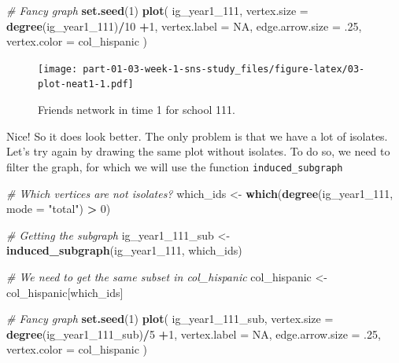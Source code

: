 \documentclass[]{book}
\newenvironment{Shaded}{\begin{snugshade}}{\end{snugshade}}
\newcommand{\CommentTok}[1]{\textcolor[rgb]{0.56,0.35,0.01}{\textit{#1}}}
\newcommand{\DataTypeTok}[1]{\textcolor[rgb]{0.13,0.29,0.53}{#1}}
\newcommand{\DecValTok}[1]{\textcolor[rgb]{0.00,0.00,0.81}{#1}}
\newcommand{\FloatTok}[1]{\textcolor[rgb]{0.00,0.00,0.81}{#1}}
\newcommand{\KeywordTok}[1]{\textcolor[rgb]{0.13,0.29,0.53}{\textbf{#1}}}
\newcommand{\NormalTok}[1]{#1}
\newcommand{\OperatorTok}[1]{\textcolor[rgb]{0.81,0.36,0.00}{\textbf{#1}}}
\newcommand{\OtherTok}[1]{\textcolor[rgb]{0.56,0.35,0.01}{#1}}
\newcommand{\StringTok}[1]{\textcolor[rgb]{0.31,0.60,0.02}{#1}}
\begin{document}
\begin{Shaded}
\begin{Highlighting}[]
\CommentTok{# Fancy graph}
\KeywordTok{set.seed}\NormalTok{(}\DecValTok{1}\NormalTok{)}
\KeywordTok{plot}\NormalTok{(}
\NormalTok{  ig_year1_}\DecValTok{111}\NormalTok{,}
  \DataTypeTok{vertex.size     =} \KeywordTok{degree}\NormalTok{(ig_year1_}\DecValTok{111}\NormalTok{)}\OperatorTok{/}\DecValTok{10} \OperatorTok{+}\DecValTok{1}\NormalTok{,}
  \DataTypeTok{vertex.label    =} \OtherTok{NA}\NormalTok{,}
  \DataTypeTok{edge.arrow.size =} \FloatTok{.25}\NormalTok{,}
  \DataTypeTok{vertex.color    =}\NormalTok{ col_hispanic}
\NormalTok{  )}
\end{Highlighting}
\end{Shaded}

\begin{figure}
\centering
\texttt{[image: part-01-03-week-1-sns-study\_files/figure-latex/03-plot-neat1-1.pdf]}
\caption{\label{fig:03-plot-neat1}Friends network in time 1 for school 111.}
\end{figure}

Nice! So it does look better. The only problem is that we have a lot of isolates. Let's try again by drawing the same plot without isolates. To do so, we need to filter the graph, for which we will use the function \texttt{induced\_subgraph}

\begin{Shaded}
\begin{Highlighting}[]
\CommentTok{# Which vertices are not isolates?}
\NormalTok{which_ids <-}\StringTok{ }\KeywordTok{which}\NormalTok{(}\KeywordTok{degree}\NormalTok{(ig_year1_}\DecValTok{111}\NormalTok{, }\DataTypeTok{mode =} \StringTok{"total"}\NormalTok{) }\OperatorTok{>}\StringTok{ }\DecValTok{0}\NormalTok{)}

\CommentTok{# Getting the subgraph}
\NormalTok{ig_year1_}\DecValTok{111}\NormalTok{_sub <-}\StringTok{ }\KeywordTok{induced_subgraph}\NormalTok{(ig_year1_}\DecValTok{111}\NormalTok{, which_ids)}

\CommentTok{# We need to get the same subset in col_hispanic}
\NormalTok{col_hispanic <-}\StringTok{ }\NormalTok{col_hispanic[which_ids]}
\end{Highlighting}
\end{Shaded}

\begin{Shaded}
\begin{Highlighting}[]
\CommentTok{# Fancy graph}
\KeywordTok{set.seed}\NormalTok{(}\DecValTok{1}\NormalTok{)}
\KeywordTok{plot}\NormalTok{(}
\NormalTok{  ig_year1_}\DecValTok{111}\NormalTok{_sub,}
  \DataTypeTok{vertex.size     =} \KeywordTok{degree}\NormalTok{(ig_year1_}\DecValTok{111}\NormalTok{_sub)}\OperatorTok{/}\DecValTok{5} \OperatorTok{+}\DecValTok{1}\NormalTok{,}
  \DataTypeTok{vertex.label    =} \OtherTok{NA}\NormalTok{,}
  \DataTypeTok{edge.arrow.size =} \FloatTok{.25}\NormalTok{,}
  \DataTypeTok{vertex.color    =}\NormalTok{ col_hispanic}
\NormalTok{  )}
\end{Highlighting}
\end{Shaded}
\end{document}
